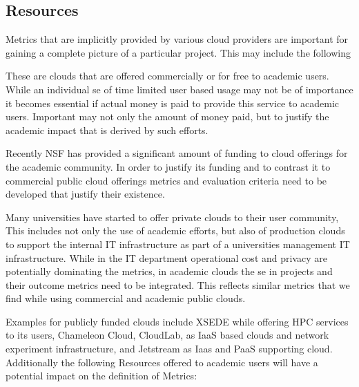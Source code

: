 \documentclass{sig-alternate-05-2015}
\begin{document}
\subsection{Resources}

Metrics that are implicitly provided by various cloud providers are
important for gaining a complete picture of a particular project. This
may include the following

\begin{description}
\setlength\itemsep{-2pt}

\item[\it Commercial public clouds.] These are clouds that are offered
  commercially or for free to academic users. While an individual se
  of time limited user based usage may not be of importance it becomes
  essential if actual money is paid to provide this service to
  academic users. Important may not only the amount of money paid, but
  to justify the academic impact \cite{??} that is derived by such efforts.

\item[\it Academic public clouds.] Recently NSF has provided a significant
  amount of funding to cloud offerings for the academic community. In
  order to justify its funding and to contrast it to commercial public
  cloud offerings metrics and evaluation criteria need to be
  developed that justify their existence. 

\item[\it Academic private clouds.] Many universities have started to
  offer private clouds to their user community, This includes not only
  the use of academic efforts, but also of production clouds to support
  the internal IT infrastructure as part of a universities management
  IT infrastructure. While in the IT department operational cost and
  privacy are potentially dominating the metrics, in academic clouds
  the se in projects and their outcome metrics need to be
  integrated. This reflects similar metrics that we find while using
  commercial and academic public clouds.

\end{description}

Examples for publicly funded clouds include XSEDE while offering HPC
services to its users, Chameleon Cloud, CloudLab, as IaaS based clouds
and network experiment infrastructure, and Jetstream as Iaas and PaaS
supporting cloud. Additionally the following Resources offered to
academic users will have a potential impact on the definition of Metrics:
\end{document}
